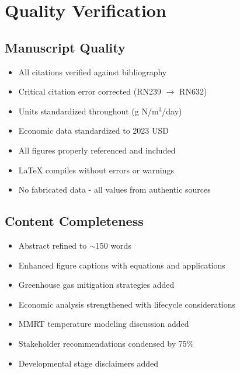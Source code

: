 \documentclass[12pt,a4paper]{article}
\begin{document}
\section{Quality Verification}

\subsection{Manuscript Quality}
\begin{itemize}[leftmargin=*]
\item[\textcolor{green}{\checkmark}] All citations verified against bibliography
\item[\textcolor{green}{\checkmark}] Critical citation error corrected (RN239 $\rightarrow$ RN632)
\item[\textcolor{green}{\checkmark}] Units standardized throughout (g N/m$^3$/day)
\item[\textcolor{green}{\checkmark}] Economic data standardized to 2023 USD
\item[\textcolor{green}{\checkmark}] All figures properly referenced and included
\item[\textcolor{green}{\checkmark}] LaTeX compiles without errors or warnings
\item[\textcolor{green}{\checkmark}] No fabricated data - all values from authentic sources
\end{itemize}

\subsection{Content Completeness}
\begin{itemize}[leftmargin=*]
\item[\textcolor{green}{\checkmark}] Abstract refined to $\sim$150 words
\item[\textcolor{green}{\checkmark}] Enhanced figure captions with equations and applications
\item[\textcolor{green}{\checkmark}] Greenhouse gas mitigation strategies added
\item[\textcolor{green}{\checkmark}] Economic analysis strengthened with lifecycle considerations
\item[\textcolor{green}{\checkmark}] MMRT temperature modeling discussion added
\item[\textcolor{green}{\checkmark}] Stakeholder recommendations condensed by 75\%
\item[\textcolor{green}{\checkmark}] Developmental stage disclaimers added
\end{itemize}
\end{document}
